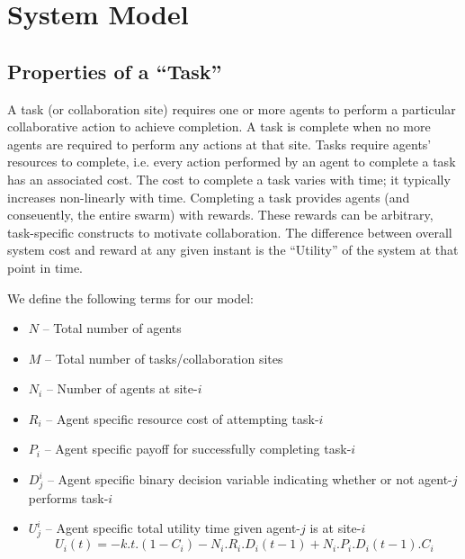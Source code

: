 \documentclass[conference]{IEEETran}
\begin{document}
\section{System Model}
\subsection{Properties of a ``Task''}
A task (or collaboration site) requires one or more agents to perform a particular collaborative action to achieve completion. A task is complete when no more agents are required to perform any  actions at that site. Tasks require agents' resources to complete, i.e. every action performed by an agent to complete a task has an associated cost. The cost to complete a task varies with time; it typically increases non-linearly with time. Completing a task provides agents (and conseuently, the entire swarm) with rewards. These rewards can be arbitrary, task-specific constructs to motivate collaboration. The difference between overall system cost and reward at any given instant is the ``Utility'' of the system at that point in time. 

We define the following terms for our model:
\begin{itemize}
	\item $N$   -- Total number of agents
	\item $M$   -- Total number of tasks/collaboration sites
	\item $N_i$ -- Number of agents at site-$i$
	\item $R_i$ -- Agent specific resource cost of attempting task-$i$
	\item $P_i$ -- Agent specific payoff for successfully completing task-$i$
	\item $D_j^i$ -- Agent specific binary decision variable indicating whether or not agent-$j$ performs task-$i$
	\item $U_j^i$ -- Agent specific total utility time given agent-$j$ is at site-$i$
	\begin{equation}
		U_i(t) = -k.t.(1 - C_i) - N_i.R_i.D_i(t-1) + N_i.P_i.D_i(t-1).C_i
	\end{equation}
\end{itemize}
\end{document}
